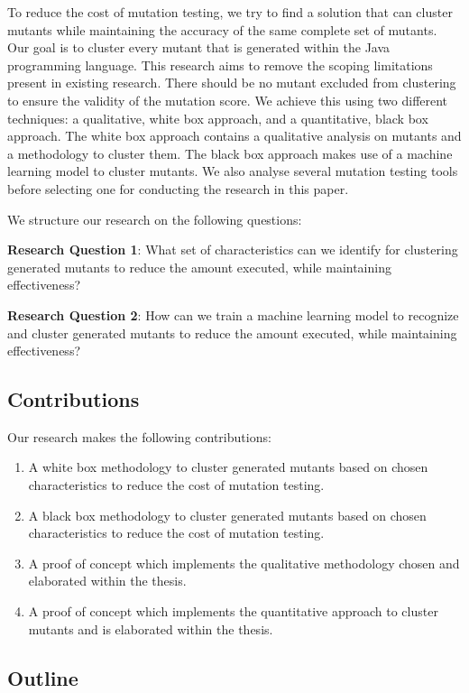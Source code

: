 \documentclass[conference,draftclsnofoot,onecolumn]{IEEEtran}
\begin{document}
To reduce the cost of mutation testing, we try to find a solution that can cluster mutants while maintaining the accuracy of the same complete set of mutants. 
Our goal is to cluster every mutant that is generated within the Java programming language.
This research aims to remove the scoping limitations present in existing research.
There should be no mutant excluded from clustering to ensure the validity of the mutation score.
We achieve this using two different techniques: a qualitative, white box approach, and a quantitative, black box approach.
The white box approach contains a qualitative analysis on mutants and a methodology to cluster them.
The black box approach makes use of a machine learning model to cluster mutants. We also analyse several mutation testing tools before selecting one for conducting the research in this paper.

We structure our research on the following questions:

\textbf{Research Question 1}: What set of characteristics can we identify for clustering generated mutants to reduce the amount executed, while maintaining effectiveness?

\textbf{Research Question 2}: How can we train a machine learning model to recognize and cluster generated mutants to reduce the amount executed, while maintaining effectiveness?

\subsection{Contributions}
Our research makes the following contributions:
\begin{enumerate}
 \item A white box methodology to cluster generated mutants based on chosen characteristics to reduce the cost of mutation testing.
  \item A black box methodology to cluster generated mutants based on chosen characteristics to reduce the cost of mutation testing.
 \item A proof of concept which implements the qualitative methodology chosen and elaborated within the thesis.
 \item A proof of concept which implements the quantitative approach to cluster mutants and is elaborated within the thesis. 
\end{enumerate}
\subsection{Outline}
\end{document}
